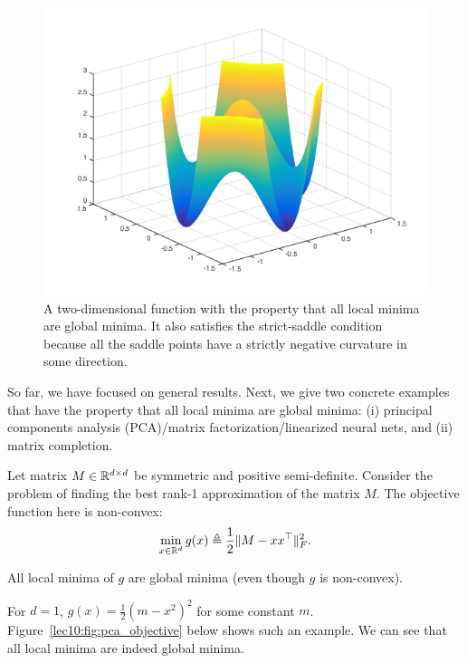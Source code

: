 \begin{figure}[ht!]
    \centering
    \includegraphics[scale = 0.5]{figures/localmin.png}
    \caption{A two-dimensional function with the property that all local minima are global minima. It also satisfies the strict-saddle condition because all the saddle points have a strictly negative curvature in some direction.}
    \label{lec10:fig:strict-saddle}
\end{figure}

So far, we have focused on general results. Next, we give two concrete examples that have the property that all local minima are global minima: (i) principal components analysis (PCA)/matrix factorization/linearized neural nets, and (ii) matrix completion. %

Let matrix $M \in \mathbb R^{d \times d}$ be symmetric and positive semi-definite. Consider the problem of finding the best rank-1 approximation of the matrix $M$. The objective function here is non-convex:
\begin{equation}
    \min_{x \in \mathbb R^d}g(x) \triangleq \frac{1}{2}\|M - xx^\top \|_F^2.
\end{equation}

\begin{theorem}
All local minima of $g$ are global minima (even though $g$ is non-convex).
\end{theorem}

\begin{remark}
For $d = 1$, $g(x) = \frac{1}{2}(m - x^2)^2$ for some constant $m$. Figure~\ref{lec10:fig:pca_objective} below shows such an example. We can see that all local minima are indeed global minima.
\end{remark}


